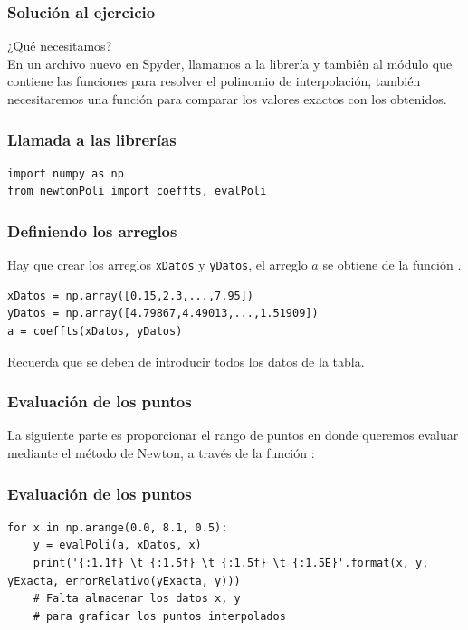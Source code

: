 \documentclass[12pt]{beamer}
\begin{document}
\begin{frame}[fragile]
\frametitle{Solución al ejercicio}
¿Qué necesitamos?
\\
\medskip
\pause
En un archivo nuevo en Spyder, llamamos a la librería  y también al módulo  que contiene las funciones para resolver el polinomio de interpolación, también necesitaremos una función  para comparar los valores exactos con los obtenidos.
\end{frame}
\begin{frame}[fragile]
\frametitle{Llamada a las librerías}
\begin{lstlisting}[caption=Llamando a las librerías y módulos]
import numpy as np
from newtonPoli import coeffts, evalPoli
\end{lstlisting}
\end{frame}
\begin{frame}[fragile]
\frametitle{Definiendo los arreglos}
Hay que crear los arreglos \texttt{xDatos} y \texttt{yDatos}, el arreglo $a$ se obtiene de la función .
\pause
\begin{lstlisting}[caption=Arreglos de la tabla]
xDatos = np.array([0.15,2.3,...,7.95])
yDatos = np.array([4.79867,4.49013,...,1.51909])
a = coeffts(xDatos, yDatos)
\end{lstlisting}
Recuerda que se deben de introducir todos los datos de la tabla.
\end{frame}
\begin{frame}[fragile]
\frametitle{Evaluación de los puntos}
La siguiente parte es proporcionar el rango de puntos en donde queremos evaluar mediante el método de Newton, a través de la función :
\end{frame}
\begin{frame}[fragile]
\frametitle{Evaluación de los puntos}
\begin{lstlisting}[caption=Evaluando los puntos y el error relativo]
for x in np.arange(0.0, 8.1, 0.5):
    y = evalPoli(a, xDatos, x)
    print('{:1.1f} \t {:1.5f} \t {:1.5f} \t {:1.5E}'.format(x, y, yExacta, errorRelativo(yExacta, y)))
    # Falta almacenar los datos x, y 
    # para graficar los puntos interpolados
\end{lstlisting}
\end{frame}
\end{document}
